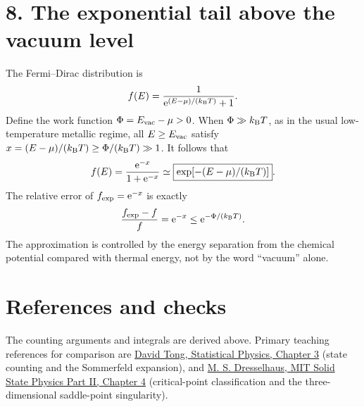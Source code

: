 \section*{8. The exponential tail above the vacuum level}
The Fermi--Dirac distribution is
\[
f(E)=\frac1{\mathrm{e}^{(E-\mu)/(k_{\mathrm B} T)}+1}.
\]
Define the work function $\Phi=E_{\rm vac}-\mu>0$. When $\Phi\gg k_{\mathrm B} T$, as in the usual low-temperature metallic regime, all $E\ge E_{\rm vac}$ satisfy
$x=(E-\mu)/(k_{\mathrm B} T)\ge\Phi/(k_{\mathrm B} T)\gg1$. It follows that
\[
f(E)=\frac{\mathrm{e}^{-x}}{1+\mathrm{e}^{-x}}
\simeq\boxed{\exp[-(E-\mu)/(k_{\mathrm B} T)]}.
\]
The relative error of $f_{\rm exp}=\mathrm{e}^{-x}$ is exactly
\[
\frac{f_{\rm exp}-f}{f}=\mathrm{e}^{-x}
\le\mathrm{e}^{-\Phi/(k_{\mathrm B} T)}.
\]
The approximation is controlled by the energy separation from the chemical potential compared with thermal energy, not by the word ``vacuum'' alone.

\section*{References and checks}
The counting arguments and integrals are derived above. Primary teaching references for comparison are
\href{https://www.damtp.cam.ac.uk/user/tong/statphys/statmechhtml/S3.html}{David Tong, Statistical Physics, Chapter 3}
(state counting and the Sommerfeld expansion), and
\href{https://www.mit.edu/course/6/6.732/www/6.732-pt2.pdf}{M. S. Dresselhaus, MIT Solid State Physics Part II, Chapter 4}
(critical-point classification and the three-dimensional saddle-point singularity).
